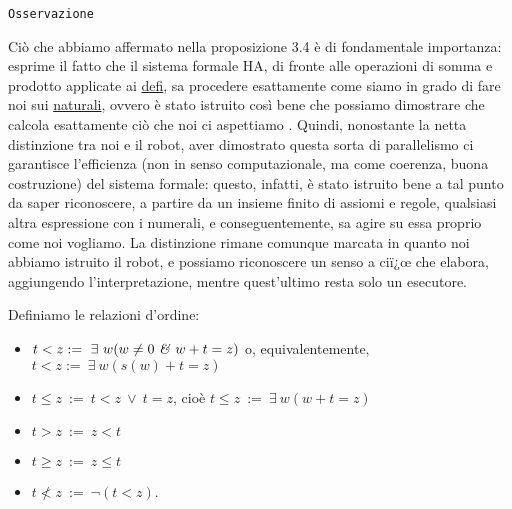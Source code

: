 \texttt{Osservazione}\\
\vspace{.2cm}

Ci\`o che abbiamo affermato nella proposizione 3.4 \`e di fondamentale importanza: esprime il fatto che il sistema formale HA, di fronte alle operazioni di somma e prodotto applicate ai \underline{defi}, sa procedere esattamente come siamo in grado di fare noi sui \underline{naturali}, ovvero \`e stato istruito cos\`i bene che possiamo dimostrare che calcola esattamente ci\`o che noi ci aspettiamo . Quindi, nonostante la netta distinzione tra noi e il robot, aver dimostrato questa sorta di parallelismo ci garantisce l'efficienza (non in senso computazionale, ma come coerenza, buona costruzione) del sistema formale: questo, infatti, \`e stato istruito bene a tal punto da saper riconoscere, a partire da un insieme finito di assiomi e regole, qualsiasi altra espressione con i numerali, e conseguentemente, sa agire su essa proprio come noi vogliamo. La distinzione rimane comunque marcata in quanto noi abbiamo istruito il robot, e possiamo riconoscere un senso a ciï¿œ che elabora, aggiungendo l'interpretazione, mentre quest'ultimo resta solo un esecutore.

\vspace{.5cm}

\begin{defi}
Definiamo le relazioni d'ordine:
\vspace{.2cm}
\begin{itemize}
\item $t<z :=\ \exists\ w(w\neq 0\ \mbox{\emph{\&}}\ w+t=z)$ o, equivalentemente, $t<z :=\ \exists\ w(s(w)+t=z)$
\vspace{.2cm}
\item $t\leq z\ :=\ t<z\ \vee\ t=z$, cio\`e $t\leq z\ :=\ \exists\ w(w+t=z)$
\vspace{.2cm}
\item $t>z\ :=\ z<t$
\vspace{.2cm}
\item $t\geq z\ :=\ z\leq t$
\vspace{.2cm}
\item $t\not< z\ :=\ \neg(t<z).$
\end{itemize}
\end{defi}

